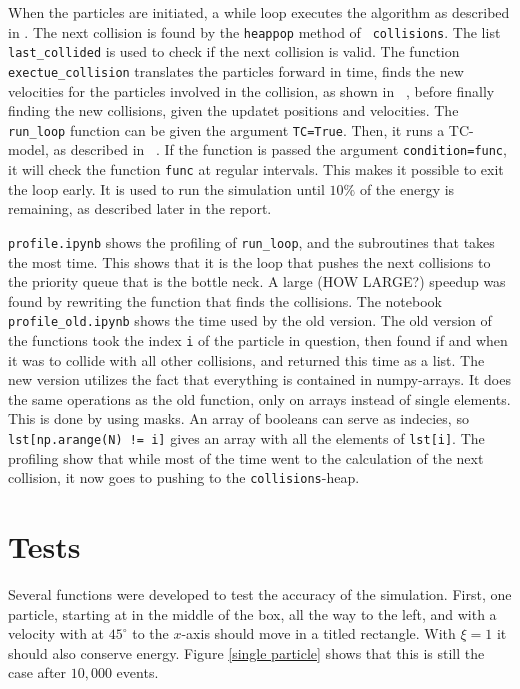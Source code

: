 \documentclass{article}
\begin{document}
        When the particles are initiated, a while loop executes the algorithm as described in \cite{exercise}. The next collision is found by the \verb|heappop| method of \verb| collisions|. The list \verb|last_collided| is used to check if the next collision is valid. The function \verb|exectue_collision| translates the particles forward in time, finds the new velocities for the particles involved in the collision, as shown in ~\cite{exercise}, before finally finding the new collisions, given the updatet positions and velocities. The \verb|run_loop| function can be given the argument \verb|TC=True|. Then, it runs a TC-model, as described in ~\cite{TC}. If the function is passed the argument \verb|condition=func|, it will check the function \verb|func| at regular intervals. This makes it possible to exit the loop early. It is used to run the simulation until $10\%$ of the energy is remaining, as described later in the report.

        \verb|profile.ipynb| shows the profiling of \verb|run_loop|, and the subroutines that takes the most time. This shows that it is the loop that pushes the next collisions to the priority queue that is the bottle neck. A large (HOW LARGE?) speedup was found by rewriting the function that finds the collisions. The notebook \verb|profile_old.ipynb| shows the time used by the old version. The old version of the functions took the index \verb|i| of the particle in question, then found if and when it was to collide with all other collisions, and returned this time as a list. The new version utilizes the fact that everything is contained in numpy-arrays. It does the same operations as the old function, only on arrays instead of single elements. This is done by using masks. An array of booleans can serve as indecies, so \verb|lst[np.arange(N) != i]| gives an array with all the elements of \verb|lst[i]|. The profiling show that while most of the time went to the calculation of the next collision, it now goes to pushing to the \verb|collisions|-heap.

    \section*{Tests}
        Several functions were developed to test the accuracy of the simulation. First, one particle, starting at in the middle of the box, all the way to the left, and with a velocity with at $45^\circ$ to the $x$-axis should move in a titled rectangle. With $\xi=1$ it should also conserve energy. Figure \ref{single particle} shows that this is still the case after $10,000$ events.
\end{document}
